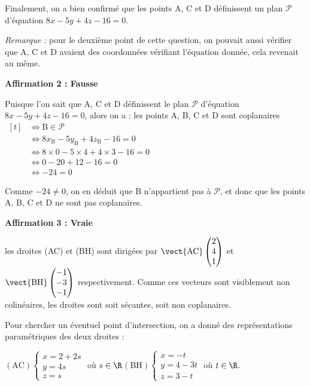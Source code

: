 Finalement, on a bien confirmé que les points A, C et D définissent un plan $\mathcal{P}$ d'équation $8 x-5 y+4 z-16=0$.

\emph{Remarque :} pour le deuxième point de cette question, on pouvait aussi vérifier que A, C et D avaient des coordonnées vérifiant l'équation donnée, cela revenait au même.

\medskip

\textbf{Affirmation 2 : Fausse}

Puisque l'on sait que A, C et D définissent le plan $\mathcal{P}$ d'équation $8x-5y+4z-16 = 0$, alors on a :
les points A, B, C et D sont coplanaires $\begin{aligned}[t] &\iff \mathrm{B} \in \mathcal{P}\\
&\iff 8x_\mathrm{B}-5y_\mathrm{B}+4z_\mathrm{B}-16 =0\\
&\iff 8\times 0 - 5\times 4 + 4\times 3 - 16 = 0\\
&\iff 0 - 20 + 12 - 16 = 0\\
&\iff -24 = 0\end{aligned}$

Comme $-24\neq 0$, on en déduit que B n'appartient pas à $\mathcal{P}$, et donc que les points A, B, C et D ne sont pas coplanaires.

\medskip

\textbf{Affirmation 3 : Vraie}

les droites (AC) et (BH) sont dirigées par $\vect{\mathrm{AC}}  \begin{pmatrix} 2\\4\\1 \end{pmatrix}$ et $\vect{\mathrm{BH}} \begin{pmatrix} -1\\-3\\-1 \end{pmatrix}$ respectivement. Comme ces vecteurs sont visiblement non colinéaires, les droites sont soit sécantes, soit non coplanaires.

Pour chercher un éventuel point d'intersection, on a donné des représentations paramétriques des deux droites :

$(\mathrm{AC}) \begin{cases} x = 2+2s\\y = 4s\\z = s \end{cases}$ où $s\in \R$\qquad $(\mathrm{BH})\begin{cases} x =  - t\\y = 4 - 3t\\z=3 - t\end{cases}$ où $t\in \R$.

